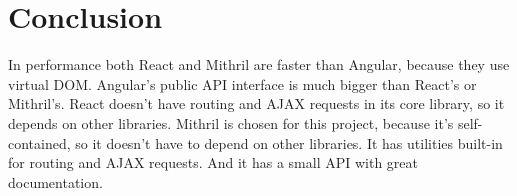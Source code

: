 \section{Conclusion}
In performance both React and Mithril are faster than Angular, because they use virtual DOM. Angular's public API interface is much bigger than React's or Mithril's. React doesn't have routing and AJAX requests in its core library, so it depends on other libraries. 
Mithril is chosen for this project, because it's  self-contained, so it doesn't have to depend on other libraries. It has utilities built-in for routing and AJAX requests. And it has a small API with great documentation. 



